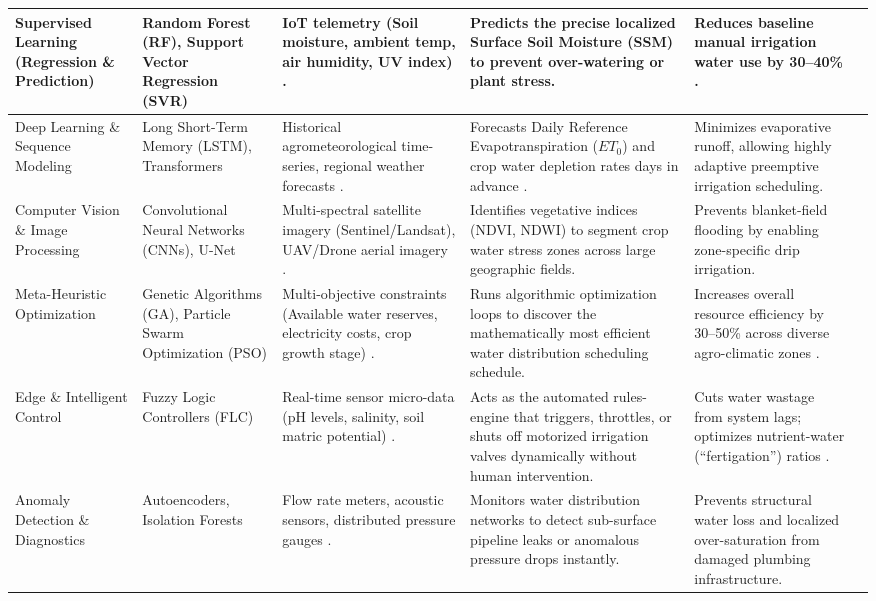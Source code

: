 \documentclass[land,article,submit,pdftex,moreauthors]{Definitions/mdpi}
\numberwithin{equation}{section}
\begin{document}
\begin{longtable}{p{2.4cm} p{2.3cm} p{2.6cm} p{2.6cm} p{2.6cm} p{2.3cm}}
Supervised Learning (Regression \& Prediction) & 
Random Forest (RF), Support Vector Regression (SVR) & 
IoT telemetry (Soil moisture, ambient temp, air humidity, UV index) \citep{Morchid2026}. & 
Predicts the precise localized Surface Soil Moisture (SSM) to prevent over-watering or plant stress. & 
Reduces baseline manual irrigation water use by 30--40\% \citep{Oguzturk2025}. \\
\midrule
Deep Learning \& Sequence Modeling & 
Long Short-Term Memory (LSTM), Transformers & 
Historical agrometeorological time-series, regional weather forecasts \citep{Sumith2026}. & 
Forecasts Daily Reference Evapotranspiration ($ET_0$) and crop water depletion rates days in advance \citep{Zhang2025}. & 
Minimizes evaporative runoff, allowing highly adaptive preemptive irrigation scheduling. \\ 
\midrule
Computer Vision \& Image Processing & 
Convolutional Neural Networks (CNNs), U-Net & 
Multi-spectral satellite imagery (Sentinel/Landsat), UAV/Drone aerial imagery \citep{Yparraguirre2026}. & 
Identifies vegetative indices (NDVI, NDWI) to segment crop water stress zones across large geographic fields. & 
Prevents blanket-field flooding by enabling zone-specific drip irrigation. \\ 
\midrule
Meta-Heuristic Optimization & 
Genetic Algorithms (GA), Particle Swarm Optimization (PSO) & 
Multi-objective constraints (Available water reserves, electricity costs, crop growth stage) \citep{Paria2025}. & 
Runs algorithmic optimization loops to discover the mathematically most efficient water distribution scheduling schedule. & 
Increases overall resource efficiency by 30--50\% across diverse agro-climatic zones \citep{Hamdouni2026}. \\ 
\midrule
Edge \& Intelligent Control & 
Fuzzy Logic Controllers (FLC) & 
Real-time sensor micro-data (pH levels, salinity, soil matric potential) \citep{Ali2025}. & 
Acts as the automated rules-engine that triggers, throttles, or shuts off motorized irrigation valves dynamically without human intervention. & 
Cuts water wastage from system lags; optimizes nutrient-water (``fertigation'') ratios \citep{Oguzturk2025}. \\ 
\midrule
Anomaly Detection \& Diagnostics & 
Autoencoders, Isolation Forests & 
Flow rate meters, acoustic sensors, distributed pressure gauges \citep{Rahman2026}. & 
Monitors water distribution networks to detect sub-surface pipeline leaks or anomalous pressure drops instantly. & 
Prevents structural water loss and localized over-saturation from damaged plumbing infrastructure. \\
\bottomrule
\end{longtable}
\end{document}
